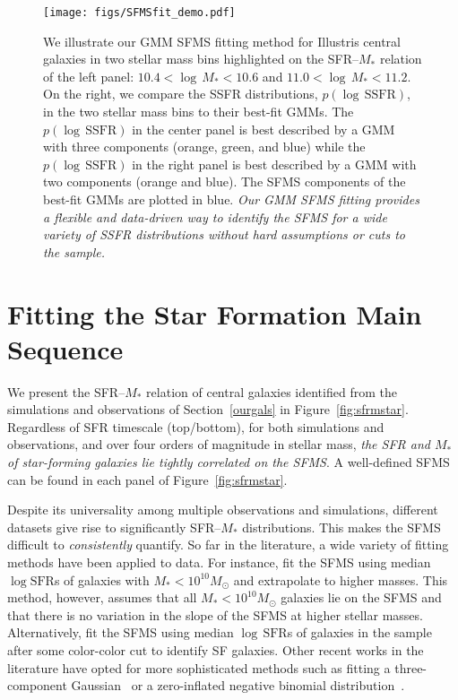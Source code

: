 \documentclass[preprint2,tighten]{aastex62}
\begin{document}
\begin{figure*}
\begin{center}
\texttt{[image: figs/SFMSfit\_demo.pdf]} 
\caption{
We illustrate our GMM SFMS fitting method for Illustris central galaxies in two 
stellar mass bins highlighted on the SFR--$M_*$ relation of the left panel: 
$10.4 < \log\,M_* < 10.6$ and $11.0 < \log\,M_* < 11.2$. On the right, we compare the SSFR 
distributions, $p(\log\,\mathrm{SSFR})$, in the two stellar 
mass bins to their best-fit GMMs. The $p(\log\,\mathrm{SSFR})$ in the center panel is best described by a 
GMM with three components (orange, green, and blue) while the
$p(\log\,\mathrm{SSFR})$ in the right panel is best described by 
a GMM with two components (orange and blue). The SFMS components of the 
best-fit GMMs are plotted in blue. \emph{Our GMM SFMS fitting provides
a flexible and data-driven way to identify the SFMS for a wide variety 
of SSFR distributions without hard assumptions or cuts to the sample.}
}\label{fig:fitdemo}
\end{center}
\end{figure*}

\section{Fitting the Star Formation Main Sequence}\label{sec:sfmsfit}
We present the SFR--$M_*$ relation of central galaxies identified 
from the simulations and observations of Section~\ref{ourgals} in 
Figure~\ref{fig:sfrmstar}. Regardless of SFR timescale (top/bottom),
for both simulations and observations, and over four orders of magnitude 
in stellar mass, \emph{the SFR and $M_*$ of star-forming galaxies lie 
tightly correlated on the SFMS}. A well-defined SFMS can be found in 
each panel of Figure~\ref{fig:sfrmstar}.

Despite its universality among multiple observations and simulations, 
different datasets give rise to significantly SFR--$M_*$ distributions.
This makes the SFMS difficult to \emph{consistently} quantify. So far 
in the literature, a wide variety 
of fitting methods have been applied to data. For instance, \cite{bluck2016} 
fit the SFMS using median $\log\mathrm{SFR}$s of galaxies with 
$M_* < 10^{10}M_\odot$ and extrapolate to higher masses. This method, however, 
assumes that all $M_* < 10^{10}M_\odot$ galaxies lie on the SFMS and that 
there is no variation in the slope of the SFMS at higher stellar masses. 
Alternatively, \cite{lee2015} fit the SFMS using median 
$\log\,\mathrm{SFR}$s of galaxies in the sample after some color-color cut 
to identify SF galaxies. Other recent works in the literature have opted 
for more sophisticated methods such as fitting a three-component
Gaussian~\citep{bisigello2018} or a zero-inflated negative binomial 
distribution~\citep{feldmann2017}. 
\end{document}
